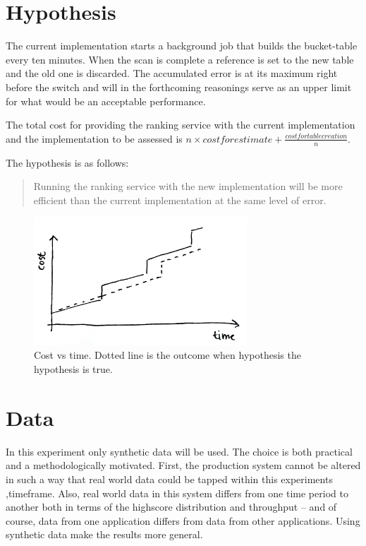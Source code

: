 \section{Hypothesis} 

The current implementation starts a background job that builds the bucket-table every ten minutes. When the scan is complete a reference is set to the new table and the old one is discarded. The accumulated error is at its maximum right before the switch and will in the forthcoming reasonings serve as an upper limit for what would be an acceptable performance.

The total cost for providing the ranking service with the current implementation and the implementation to be assessed is $n \times costforestimate + \frac{ costfortablecreation}{n}$.



The hypothesis is as follows:

\blockquote{Running the ranking service with the new implementation will be more efficient than the current implementation at the same level of error.}

\begin{figure}[h]
  \centering
  \caption{Cost vs time. Dotted line is the outcome when hypothesis the hypothesis is true.}
  \label{fig:cost}
  \includegraphics[width=8cm]{img/hypothesis.jpg}
\end{figure} 


\section{Data}

In this experiment only synthetic data will be used. The choice is both practical and a methodologically motivated. First, the production system cannot be altered in such a way that real world data could be tapped within this experiments ,timeframe. Also, real world data in this system differs from one time period to another both in terms of the highscore distribution and throughput -- and of course, data from one application differs from data from other applications. Using synthetic data make the results more general.

